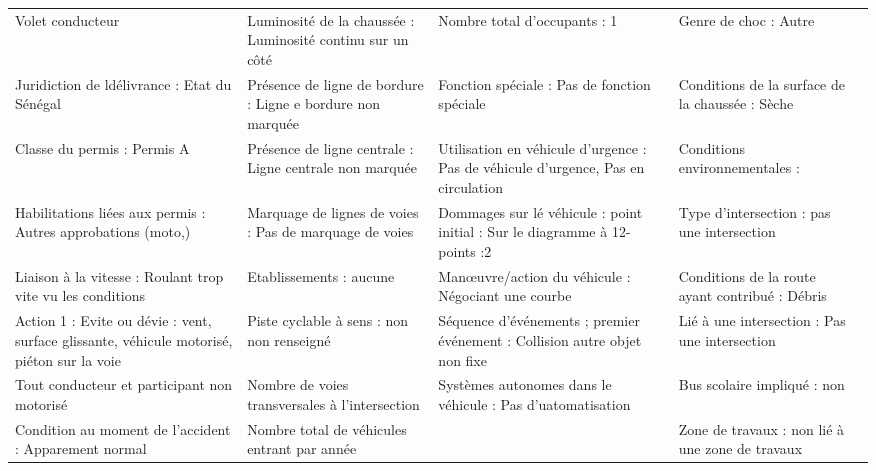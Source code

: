 \documentclass[a4paper,12pt,twoside,french]{book}
[a4paper,12pt,twoside]
\begin{document}
\begin{landscape}
\begin{table}[]
\begin{adjustbox}{width=2.1\textwidth,center=\textwidth}
\begin{tabular}{|l|l|l|l|l|}
{\color[HTML]{196B24} Volet conducteur}                                                      & Luminosité de la chaussée : Luminosité continu sur un côté & Nombre total d'occupants : 1                                                        & Genre de choc : Autre                                 &  \\
Juridiction de ldélivrance : Etat du   Sénégal                                               & Présence de ligne de bordure : Ligne e bordure non marquée & Fonction spéciale : Pas de fonction spéciale                                        & Conditions de la surface de la chaussée : Sèche       &  \\
Classe du permis : Permis A                                                                  & Présence de ligne centrale : Ligne centrale non marquée    & Utilisation en véhicule d’urgence : Pas de véhicule d’urgence, Pas en   circulation & Conditions environnementales :                        &  \\
Habilitations liées aux permis : Autres   approbations (moto,)                               & Marquage de lignes de voies : Pas de marquage de voies     & Dommages sur lé véhicule : point initial : Sur le diagramme à 12-points   :2        & Type d'intersection : pas une intersection            &  \\
Liaison à la vitesse : Roulant trop vite   vu les conditions                                 & Etablissements : aucune                                    & Manœuvre/action du véhicule : Négociant une courbe                                  & Conditions de la route ayant contribué : Débris       &  \\
Action 1 : Evite ou dévie : vent, surface   glissante, véhicule motorisé, piéton sur la voie & Piste cyclable à sens : non  non   renseigné               & Séquence d'événements ; premier événement : Collision autre objet non   fixe        & Lié à une intersection : Pas une intersection         &  \\
{\color[HTML]{196B24} Tout conducteur et participant   non motorisé}                         & Nombre de voies transversales à l’intersection             & Systèmes autonomes dans le véhicule : Pas d'uatomatisation                          & Bus scolaire impliqué : non                           &  \\
Condition au moment de l'accident :   Apparement normal                                      & Nombre total de véhicules entrant par année                &                                                                                     & Zone de travaux  : non lié à une   zone de travaux    &  \\

\end{tabular}
\end{adjustbox}
\end{table}
\end{landscape}
\end{document}
